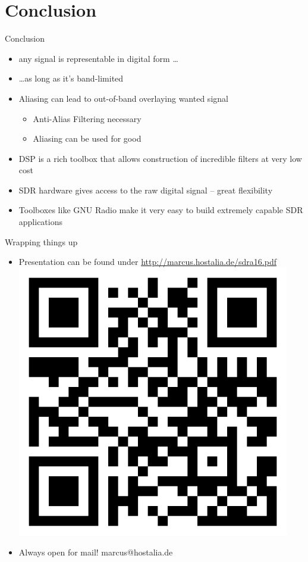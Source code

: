 \documentclass{beamer}
\begin{document}
\section{Conclusion}
\begin{frame}{Conclusion}
  \begin{itemize}
    \item any signal is representable in digital form \ldots
    \item \ldots as long as it's band-limited
    \item Aliasing can lead to out-of-band overlaying wanted signal
    \begin{itemize}
      \item Anti-Alias Filtering necessary
      \item Aliasing can be used for good
    \end{itemize}
    \item DSP is a rich toolbox that allows construction of incredible filters at very low cost
    \item SDR hardware gives access to the raw digital signal -- great flexibility
    \item Toolboxes like GNU Radio make it very easy to build extremely capable SDR applications
  \end{itemize}
\end{frame}

\begin{frame}{Wrapping things up}
  \begin{itemize}
    \item Presentation can be found under \url{http://marcus.hostalia.de/sdra16.pdf}
  \includegraphics[height=0.25\textheight]{qrcode}
\item Always open for mail! marcus@hostalia.de
  \end{itemize}
\end{frame}
\end{document}
